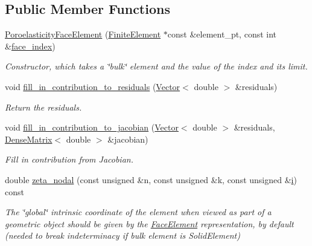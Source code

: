 \subsection*{Public Member Functions}
\begin{DoxyCompactItemize}
\item 
\hyperlink{classoomph_1_1PoroelasticityFaceElement_a1eb47446a15ae0a5762685ea34757362}{Poroelasticity\+Face\+Element} (\hyperlink{classoomph_1_1FiniteElement}{Finite\+Element} $\ast$const \&element\+\_\+pt, const int \&\hyperlink{classoomph_1_1FaceElement_a478d577ac6db67ecc80f1f02ae3ab170}{face\+\_\+index})
\begin{DoxyCompactList}\small\item\em Constructor, which takes a \char`\"{}bulk\char`\"{} element and the value of the index and its limit. \end{DoxyCompactList}\item 
void \hyperlink{classoomph_1_1PoroelasticityFaceElement_a4396aa8d950dca2c1eba4bfb9e8d608c}{fill\+\_\+in\+\_\+contribution\+\_\+to\+\_\+residuals} (\hyperlink{classoomph_1_1Vector}{Vector}$<$ double $>$ \&residuals)
\begin{DoxyCompactList}\small\item\em Return the residuals. \end{DoxyCompactList}\item 
void \hyperlink{classoomph_1_1PoroelasticityFaceElement_a14cbf11e9cf001563087f15f8f9806b7}{fill\+\_\+in\+\_\+contribution\+\_\+to\+\_\+jacobian} (\hyperlink{classoomph_1_1Vector}{Vector}$<$ double $>$ \&residuals, \hyperlink{classoomph_1_1DenseMatrix}{Dense\+Matrix}$<$ double $>$ \&jacobian)
\begin{DoxyCompactList}\small\item\em Fill in contribution from Jacobian. \end{DoxyCompactList}\item 
double \hyperlink{classoomph_1_1PoroelasticityFaceElement_af8381ad4d2c26cbc397d571ff56bc85f}{zeta\+\_\+nodal} (const unsigned \&n, const unsigned \&k, const unsigned \&\hyperlink{cfortran_8h_adb50e893b86b3e55e751a42eab3cba82}{i}) const
\begin{DoxyCompactList}\small\item\em The \char`\"{}global\char`\"{} intrinsic coordinate of the element when viewed as part of a geometric object should be given by the \hyperlink{classoomph_1_1FaceElement}{Face\+Element} representation, by default (needed to break indeterminacy if bulk element is Solid\+Element) \end{DoxyCompactList}\item 

\end{DoxyCompactItemize}
